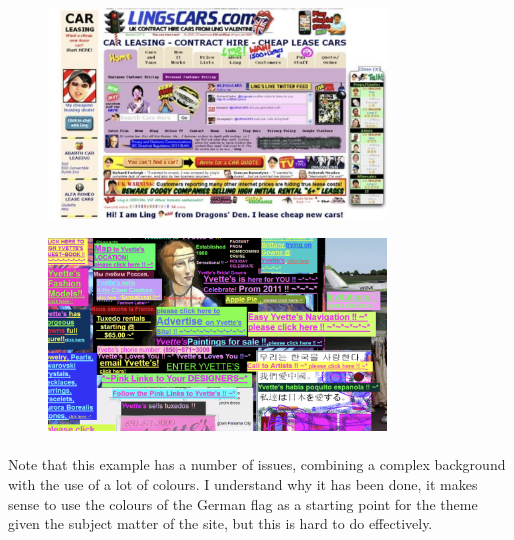 \begin{figure}[H]
    \centering
    \includegraphics[width=0.8\textwidth]{figures/bad-colours-too-many-colours-1}
    \label{fig:bad-colours-too-many-colours-1}
    \caption{}
\end{figure}


\begin{figure}[H]
    \centering
    \includegraphics[width=0.8\textwidth]{figures/bad-colours-too-many-colours-2}
    \label{fig:bad-colours-too-many-colours-2}
    \caption{}
\end{figure}


\paragraph{} Note that this example has a number of issues, combining a complex background with the use of a lot of colours. I understand why it has been done, it makes sense to use the colours of the German flag as a starting point for the theme given the subject matter of the site, but this is hard to do effectively.



